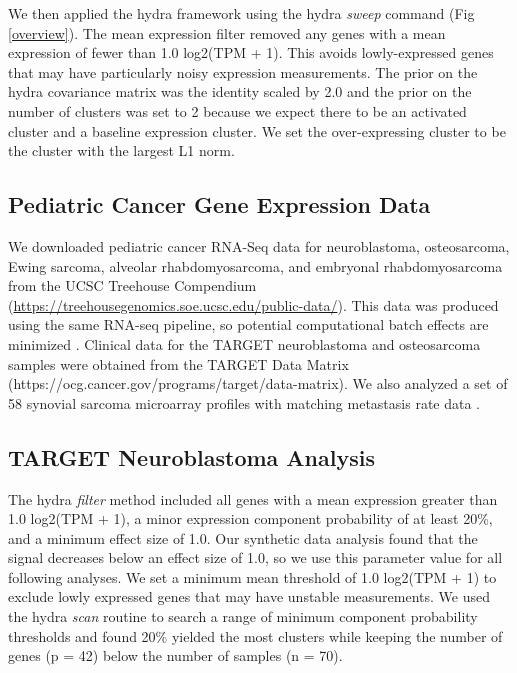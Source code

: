 \documentclass[10pt,letterpaper]{article}
\begin{document}
We then applied the hydra framework using the hydra \textit{sweep} command (Fig \ref{overview}). The mean expression filter removed any genes with a mean expression of fewer than 1.0 log2(TPM + 1). This avoids lowly-expressed genes that may have particularly noisy expression measurements. The prior on the hydra covariance matrix was the identity scaled by 2.0 and the prior on the number of clusters was set to 2 because we expect there to be an activated cluster and a baseline expression cluster. We set the over-expressing cluster to be the cluster with the largest L1 norm.
 

\subsection*{Pediatric Cancer Gene Expression Data}
We downloaded pediatric cancer RNA-Seq data for neuroblastoma, osteosarcoma, Ewing sarcoma, alveolar rhabdomyosarcoma, and embryonal rhabdomyosarcoma from the UCSC Treehouse Compendium (\url{https://treehousegenomics.soe.ucsc.edu/public-data/}). This data was produced using the same RNA-seq pipeline, so potential computational batch effects are minimized \cite{vivianToilEnablesReproducible2017,vaskeComparativeTumorRNA2019}. Clinical data for the TARGET neuroblastoma and osteosarcoma samples were obtained from the TARGET Data Matrix (https://ocg.cancer.gov/programs/target/data-matrix). We also analyzed a set of 58 synovial sarcoma microarray profiles with matching metastasis rate data \cite{lagardeChromosomeInstabilityAccounts2013}.
 
\subsection*{TARGET Neuroblastoma Analysis}
The hydra \textit{filter} method included all genes with a mean expression greater than 1.0 log2(TPM + 1), a minor expression component probability of at least 20\%, and a minimum effect size of 1.0. Our synthetic data analysis found that the signal decreases below an effect size of 1.0, so we use this parameter value for all following analyses. We set a minimum mean threshold of 1.0 log2(TPM + 1) to exclude lowly expressed genes that may have unstable measurements. We used the hydra \textit{scan} routine to search a range of minimum component probability thresholds and found 20\% yielded the most clusters while keeping the number of genes (p = 42) below the number of samples (n = 70). 
\end{document}
